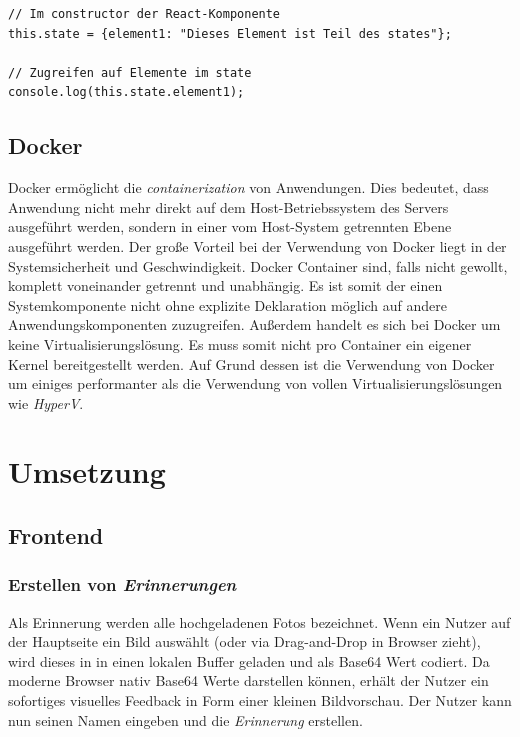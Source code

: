 \documentclass[12pt,a4paper]{report}
\begin{document}
\begin{verbatim}
// Im constructor der React-Komponente
this.state = {element1: "Dieses Element ist Teil des states"};

// Zugreifen auf Elemente im state
console.log(this.state.element1);
\end{verbatim}


\section{Docker}

Docker ermöglicht die \textit{containerization} von Anwendungen. Dies bedeutet, dass Anwendung nicht mehr direkt auf dem Host-Betriebssystem des Servers ausgeführt werden, sondern in einer vom Host-System getrennten Ebene ausgeführt werden. Der große Vorteil bei der Verwendung von Docker liegt in der Systemsicherheit und Geschwindigkeit. Docker Container sind, falls nicht gewollt, komplett voneinander getrennt und unabhängig. Es ist somit der einen Systemkomponente nicht ohne explizite Deklaration möglich auf andere Anwendungskomponenten zuzugreifen. Außerdem handelt es sich bei Docker um keine Virtualisierungslösung. Es muss somit nicht pro Container ein eigener Kernel bereitgestellt werden. Auf Grund dessen ist die Verwendung von Docker um einiges performanter als die Verwendung von vollen Virtualisierungslösungen wie \textit{HyperV}.

\newpage
\chapter{Umsetzung}

\section{Frontend}

\subsection{Erstellen von \textit{Erinnerungen}}
Als Erinnerung werden alle hochgeladenen Fotos bezeichnet. Wenn ein Nutzer auf der Hauptseite ein Bild auswählt (oder via Drag-and-Drop in Browser zieht), wird dieses in in einen lokalen Buffer geladen und als Base64 Wert codiert. Da moderne Browser nativ Base64 Werte darstellen können, erhält der Nutzer ein sofortiges visuelles Feedback in Form einer kleinen Bildvorschau. Der Nutzer kann nun seinen Namen eingeben und die \textit{Erinnerung} erstellen.
\end{document}

